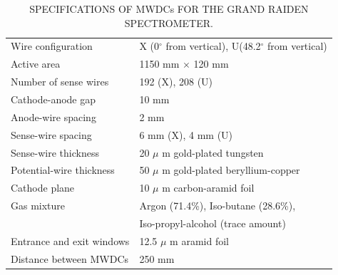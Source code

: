 \begin{table}[tpb]
  \setlength{\capwidth}{0.7\textwidth}
  \begin{center}
    \caption{SPECIFICATIONS OF MWDCs FOR THE GRAND RAIDEN SPECTROMETER\citep{yosoi_thesis}.}
    \label{tb:MWDC}
    \begin{tabular}{ll} \toprule
      \hline
      Wire configuration                        &           X (0$^{\circ}$ from vertical), U(48.2$^{\circ}$ from vertical) \\
      Active area                               &           1150 mm $\times$ 120 mm\\
      Number of sense wires                     &           192 (X), 208 (U)\\
      Cathode-anode gap                         &           10 mm       \\
      Anode-wire spacing                        &           2 mm\\
      Sense-wire spacing                        &           6 mm (X), 4 mm (U)\\
      Sense-wire thickness                      &           20 $\mu$ m gold-plated tungsten\\
      Potential-wire thickness                  &           50 $\mu$ m gold-plated beryllium-copper\\
      Cathode plane                             &           10 $\mu$ m carbon-aramid foil\\
      Gas mixture                               &           Argon (71.4\%), Iso-butane (28.6\%), \\
                                                &           Iso-propyl-alcohol (trace amount)\\
      Entrance and exit windows                 &           12.5 $\mu$ m aramid foil\\
      Distance between MWDCs                    &           250 mm\\
      \bottomrule
    \end{tabular}
  \end{center}
\end{table}


